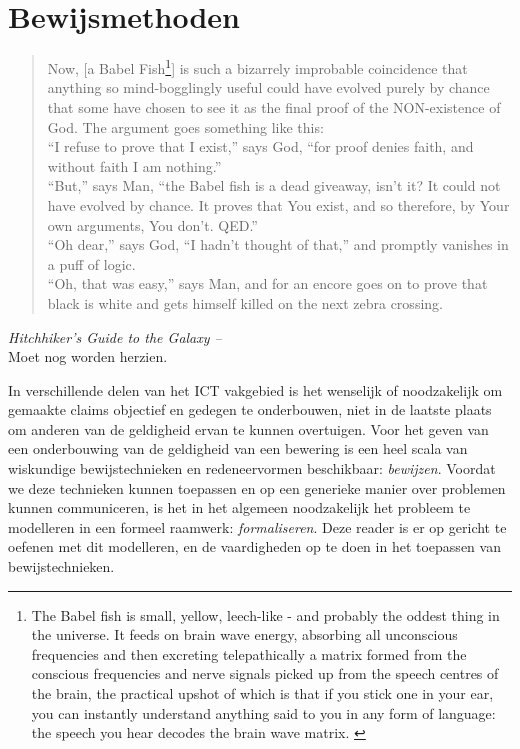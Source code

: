 \chapter{Bewijsmethoden}\label{ch:bew:meth}
\begin{quote}
Now, [a Babel Fish\footnote{The Babel fish is small, yellow, leech-like - and probably the oddest thing in the universe. It feeds on brain wave energy, absorbing all unconscious frequencies and then excreting telepathically a matrix formed from the conscious frequencies and nerve signals picked up from the speech centres of the brain, the practical upshot of which is that if you stick one in your ear, you can instantly understand anything said to you in any form of language: the speech you hear decodes the brain wave matrix. \citep{adams}}] is such a bizarrely improbable coincidence that anything so mind-bogglingly useful could have evolved purely by chance that some have chosen to see it as the final proof of the NON-existence of God. The argument goes something like this:\\[2.5pt]
``I refuse to prove that I exist,'' says God, ``for proof denies faith, and without faith I am nothing.''\\[2.5pt]
``But,'' says Man, ``the Babel fish is a dead giveaway, isn't it? It could not have evolved by chance. It proves that You exist, and so therefore, by Your own arguments, You don't. QED.''\\[2.5pt]
``Oh dear,'' says God, ``I hadn't thought of that,'' and promptly vanishes in a puff of logic.\\[2.5pt]
``Oh, that was easy,'' says Man, and for an encore goes on to prove that black is white and gets himself killed on the next zebra crossing.
\end{quote}
\mbox{}\hfill\textit{Hitchhiker's Guide to the Galaxy -- \citet{adams}}\\[5pt]

{ \color{hured} Moet nog worden herzien.}

In verschillende delen van het ICT vakgebied is het wenselijk of noodzakelijk om gemaakte claims objectief en gedegen te onderbouwen, niet in de laatste plaats om anderen van de geldigheid ervan te kunnen overtuigen. Voor het geven van een onderbouwing van de geldigheid van een bewering is een heel scala van wiskundige bewijstechnieken en redeneervormen beschikbaar: \textit{bewijzen}. Voordat we deze technieken kunnen toepassen en op een generieke manier over problemen kunnen communiceren, is het in het algemeen noodzakelijk het probleem te modelleren in een formeel raamwerk: \textit{formaliseren}. Deze reader is er op gericht te oefenen met dit modelleren, en de vaardigheden op te doen in het toepassen van bewijstechnieken. 

